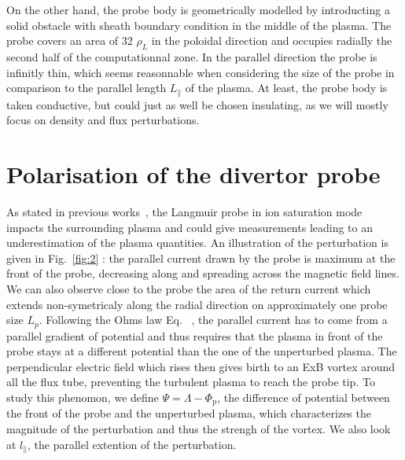 \documentclass[cpp,a4paper,fleqn,twoside%
]{w-art}
\makeatletter
\renewcommand*{\eqref}[1]{%
  \hyperref[{#1}]{\textup{\tagform@{\ref*{#1}}}}%
}
\makeatother
\begin{document}
On the other hand, the probe body is geometrically modelled by introducting
a solid obstacle with sheath boundary condition in the middle of the plasma. The
probe covers an area of 32 $\rho_L$ in the poloidal direction and occupies
radially the second half of the computationnal zone. In the parallel
direction the probe is infinitly thin, which seems reasonnable when
considering the size of the probe in comparison to the
parallel length $L_\parallel$ of the plasma.
At least, the probe body is taken conductive, but could just as well be chosen
insulating, as we will mostly focus on density and flux perturbations.

\section{Polarisation of the divertor probe}

As stated in previous works~\cite{Ghendrih03, Colin14, Futtersack16}, the
Langmuir probe in ion saturation mode impacts the surrounding plasma and could give
measurements leading to an underestimation of the plasma quantities. 
An illustration of the perturbation is given in Fig.~\ref{fig:2} :
 the parallel current drawn by the probe is maximum at the front of the probe, decreasing 
along and spreading across the magnetic field lines. We can also 
observe close to the probe the area of the return current which extends 
non-symetricaly along the radial direction on approximately one probe 
size $L_p$. Following 
the Ohms law Eq.~\eqref{eq_Ohms_law}, the parallel current has to come from a parallel gradient 
of potential and thus requires that the plasma in front of the probe stays at a different 
potential than the one of the unperturbed plasma. The perpendicular
electric field which rises then gives birth to an ExB vortex around all the flux tube,
preventing the turbulent plasma to reach the probe tip. To study
this phenomon, we define $\Psi=\Lambda-\Phi_\text{p}$, the difference of potential between 
the front of the probe and the unperturbed plasma, which characterizes the magnitude of the 
perturbation and thus the strengh of the vortex. We also look at $l_\parallel$, the parallel 
extention of the perturbation.
\end{document}
